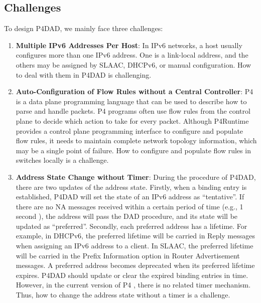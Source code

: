 \documentclass[a4paper,fleqn]{cas-dc}
\begin{document}
    \subsection{Challenges}
        To design P4DAD, we mainly face three challenges:
        \begin{enumerate}[1)]
            \item \textbf{Multiple IPv6 Addresses Per Host}: In IPv6 networks, a host usually configures more than one IPv6 address. One is a link-local address, and the others may be assigned by SLAAC, DHCPv6, or manual configuration. How to deal with them in P4DAD is challenging.
            
            \item \textbf{Auto-Configuration of Flow Rules without a Central Controller}: P4 is a data plane programming language that can be used to describe how to parse and handle packets. P4 programs often use flow rules from the control plane to decide which action to take for every packet. Although P4Runtime \cite{p4runtime} provides a control plane programming interface to configure and populate flow rules, it needs to maintain complete network topology information, which may be a single point of failure. How to configure and populate flow rules in switches locally is a challenge.

            \item \textbf{Address State Change without Timer}: During the procedure of P4DAD, there are two updates of the address state. Firstly, when a binding entry is established, P4DAD will set the state of an IPv6 address as ``tentative''. If there are no NA messages received within a certain period of time (e.g., 1 second \cite{slaac}), the address will pass the DAD procedure, and its state will be updated as ``preferred''. 
            Secondly, each preferred address has a lifetime. For example, in DHCPv6, the preferred lifetime will be carried in Reply messages \cite{DHCPv6} when assigning an IPv6 address to a client. In SLAAC, the preferred lifetime will be carried in the Prefix Information option in Router Advertisement messages. A preferred address becomes deprecated when its preferred lifetime expires. 
            P4DAD should update or clear the expired binding entries in time. However, in the current version of P4 \cite{P4}, there is no related timer mechanism. Thus, how to change the address state without a timer is a challenge.
        \end{enumerate}
\end{document}
